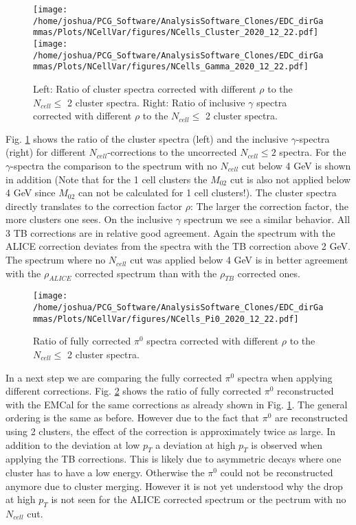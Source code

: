 \documentclass[ALICE]{ALICE_analysis_notes}
\begin{document}
\begin{figure}[t]
	\centering
	\texttt{[image: /home/joshua/PCG\_Software/AnalysisSoftware\_Clones/EDC\_dirGammas/Plots/NCellVar/figures/NCells\_Cluster\_2020\_12\_22.pdf]}
	\texttt{[image: /home/joshua/PCG\_Software/AnalysisSoftware\_Clones/EDC\_dirGammas/Plots/NCellVar/figures/NCells\_Gamma\_2020\_12\_22.pdf]}
	\caption{Left: Ratio of cluster spectra corrected with different $\rho$ to the $N_{cell} \leq$ 2 cluster spectra. Right: Ratio of inclusive $\gamma$ spectra corrected with different $\rho$ to the $N_{cell} \leq$ 2 cluster spectra.}
	\label{fig:NCells_ClusGammaSpec}
\end{figure}
Fig. \ref{fig:NCells_ClusGammaSpec} shows the ratio of the cluster spectra (left) and the inclusive $\gamma$-spectra (right) for different $N_{cell}$-corrections to the uncorrected $N_{cell} \leq 2$ spectra. For the $\gamma$-spectra the comparison to the spectrum with no $N_{cell}$ cut below 4 GeV is shown in addition (Note that for the 1 cell clusters the $M_{02}$ cut is also not applied below 4 GeV since $M_{02}$ can not be calculated for 1 cell clusters!). The cluster spectra directly translates to the correction factor $\rho$: The larger the correction factor, the more clusters one sees. On the inclusive $\gamma$ spectrum we see a similar behavior. All 3 TB corrections are in relative good agreement. Again the spectrum with the ALICE correction deviates from the spectra with the TB correction above 2 GeV. The spectrum where no $N_{cell}$ cut was applied below 4 GeV is in better agreement with the $\rho_{ALICE}$ corrected spectrum than with the $\rho_{TB}$ corrected ones.\\
\begin{figure}[t]
	\centering
	\texttt{[image: /home/joshua/PCG\_Software/AnalysisSoftware\_Clones/EDC\_dirGammas/Plots/NCellVar/figures/NCells\_Pi0\_2020\_12\_22.pdf]}
	\caption{Ratio of fully corrected $\pi^{0}$ spectra corrected with different $\rho$ to the $N_{cell} \leq$ 2 cluster spectra.}
	\label{fig:NCells_Pi0Spec}
\end{figure}
In a next step we are comparing the fully corrected $\pi^{0}$ spectra when applying different corrections. Fig. \ref{fig:NCells_Pi0Spec} shows the ratio of fully corrected $\pi^{0}$ reconstructed with the EMCal for the same corrections as already shown in Fig. \ref{fig:NCells_ClusGammaSpec}. The general ordering is the same as before. However due to the fact that $\pi^{0}$ are reconstructed using 2 clusters, the effect of the correction is approximately twice as large. In addition to the deviation at low $p_{T}$ a deviation at high $p_{T}$ is observed when applying the TB corrections. This is likely due to asymmetric decays where one cluster has to have a low energy. Otherwise the $\pi^{0}$ could not be reconstructed anymore due to cluster merging. However it is not yet understood why the drop at high $p_{T}$ is not seen for the ALICE corrected spectrum or the pectrum with no $N_{cell}$ cut. \\
\end{document}
